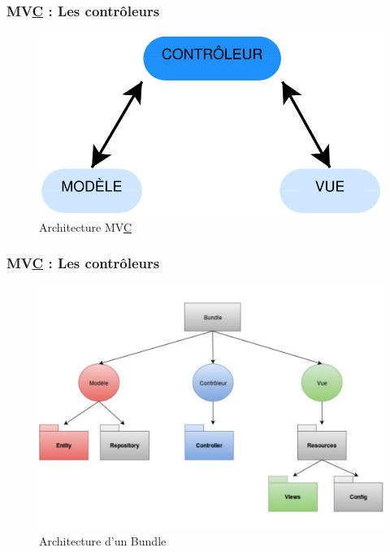\speaker{\Florian}


\begin{frame}
  \frametitle{MV\underline{C} : Les contrôleurs}   
\begin{figure}[!h]
	\begin{center}
	\includegraphics[scale=0.5]{images/mvcControleur}
	\caption{Architecture MV\underline{C}}
	\end{center}
\end{figure}
\end{frame}


\begin{frame}
  \frametitle{MV\underline{C} : Les contrôleurs}   
\begin{figure}[!h]
	\begin{center}
	\includegraphics[scale=0.3]{images/bundles}
	\caption{Architecture d'un Bundle}
	\end{center}
\end{figure}
\end{frame}

